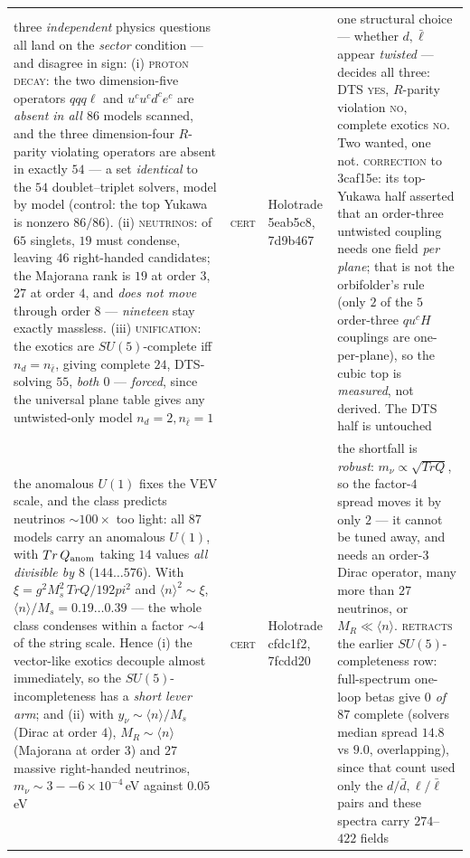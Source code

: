\documentclass[12pt,a4paper]{article}
\def\mathrm#1{#1}%
\def\textbf#1{#1}%
\def\texttt#1{#1}%
\def\text#1{#1}%
\def\pi{pi}%
\theoremstyle{definition}
\begin{document}
\begin{center}
\begin{tabular}{@{}p{}llp{}@{}}
\textbf{three \emph{independent} physics questions all land on the \emph{sector} condition --- and disagree in sign}: (i) \textsc{proton decay}: the two dimension-five operators $qqq\ell$ and $u^cu^cd^ce^c$ are \emph{absent in all $86$} models scanned, and the three dimension-four $R$-parity violating operators are absent in exactly $54$ --- a set \emph{identical} to the $54$ doublet--triplet solvers, model by model (control: the top Yukawa is nonzero $86/86$). (ii) \textsc{neutrinos}: of $65$ singlets, $19$ must condense, leaving $46$ right-handed candidates; the Majorana rank is $19$ at order $3$, $27$ at order $4$, and \emph{does not move} through order $8$ --- \emph{nineteen} stay exactly massless. (iii) \textsc{unification}: the exotics are $SU(5)$-complete iff $n_d=n_{\bar\ell}$, giving complete $24$, DTS-solving $55$, \emph{both $0$} --- \emph{forced}, since the universal plane table gives any untwisted-only model $n_d=2,n_{\bar\ell}=1$ & \textsc{cert} & Holotrade \texttt{5eab5c8}, \texttt{7d9b467} & one structural choice --- whether $d,\bar\ell$ appear \emph{twisted} --- decides all three: DTS \textsc{yes}, $R$-parity violation \textsc{no}, complete exotics \textsc{no}. Two wanted, one not. \textsc{correction} to \texttt{3caf15e}: its top-Yukawa half asserted that an order-three untwisted coupling needs one field \emph{per plane}; that is not the orbifolder's rule (only $2$ of the $5$ order-three $qu^cH$ couplings are one-per-plane), so the cubic top is \emph{measured}, not derived. The DTS half is untouched \\
\textbf{the anomalous $U(1)$ fixes the VEV scale, and the class predicts neutrinos $\sim\!100\times$ too light}: all $87$ models carry an anomalous $U(1)$, with $\mathrm{Tr}\,Q_{\rm anom}$ taking $14$ values \emph{all divisible by $8$} ($144\ldots576$). With $\xi=g^2M_s^2\,\mathrm{Tr}Q/192\pi^2$ and $\langle n\rangle^2\!\sim\!\xi$, $\langle n\rangle/M_s=0.19\ldots0.39$ --- the whole class condenses within a factor $\sim\!4$ of the string scale. Hence (i) the vector-like exotics decouple almost immediately, so the $SU(5)$-incompleteness has a \emph{short lever arm}; and (ii) with $y_\nu\sim\langle n\rangle/M_s$ (Dirac at order $4$), $M_R\sim\langle n\rangle$ (Majorana at order $3$) and $27$ massive right-handed neutrinos, $m_\nu\sim3\text{--}6\times10^{-4}$\,eV against $0.05$\,eV & \textsc{cert} & Holotrade \texttt{cfdc1f2}, \texttt{7fcdd20} & the shortfall is \emph{robust}: $m_\nu\propto\sqrt{\mathrm{Tr}Q}$, so the factor-$4$ spread moves it by only $2$ --- it cannot be tuned away, and needs an order-$3$ Dirac operator, many more than $27$ neutrinos, or $M_R\!\ll\!\langle n\rangle$. \textsc{retracts} the earlier $SU(5)$-completeness row: full-spectrum one-loop betas give \emph{$0$ of $87$} complete (solvers median spread $14.8$ vs $9.0$, overlapping), since that count used only the $d/\bar d,\ell/\bar\ell$ pairs and these spectra carry $274$--$422$ fields \\

\end{tabular}
\end{center}
\end{document}
